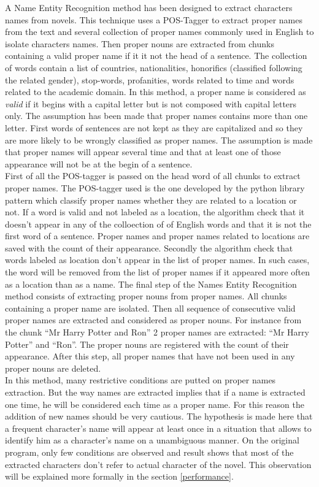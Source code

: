 \documentclass[a4paper, 12pt]{report}
\begin{document}
A Name Entity Recognition method has been designed to extract characters names from novels. This technique uses a POS-Tagger to extract proper names from the text and several collection of proper names commonly used in English to isolate characters names. Then proper nouns are extracted from chunks containing a valid proper name if it it not the head of a sentence. The collection of words contain a list of countries, nationalities, honorifics (classified following the related gender), stop-words, profanities, words related to time and words related to the academic domain. In this method, a  proper name is considered as \textit{valid} if it begins with a capital letter but is not composed with capital letters only. The assumption has been made that proper names contains more than one letter.  First words of sentences are not kept as they are capitalized and so they are more likely to be wrongly classified as proper names. The assumption is made that proper names will appear several time and that at least one of those appearance will not be at the begin of a sentence.\\

First of all the POS-tagger is passed on the head word of all chunks to extract  proper names. The POS-tagger used is the one developed by the python library pattern which classify  proper names whether they are related to a location or not. If a word is valid and not labeled as a location, the algorithm check that it doesn't appear in any of the colloection of of English words and that it is not the first word of a sentence. Proper names and  proper names related to locations are saved with the count of their appearance.
Secondly the algorithm check that words labeled as location don't appear in the list of proper names. In such cases, the word will be removed from the list of proper names if it appeared more often as a location than as a name.
The final step of the Names Entity Recognition method consists of extracting proper nouns from proper names. All chunks containing a proper name are isolated. Then all sequence of consecutive valid  proper names are extracted and considered as proper nouns. For instance from the chunk ``Mr Harry Potter and Ron'' 2 proper names are extracted: ``Mr Harry Potter'' and ``Ron''. The proper nouns are registered with the count of their appearance. After this step, all proper names that have not been used in any proper nouns are deleted.\\

In this method, many restrictive conditions are putted on proper names extraction. But the way names are extracted implies that if a name is extracted one time, he will be considered each time as a proper name. For this reason the addition of new names should be very cautious. The hypothesis is made here that a frequent character's name will appear at least once in a situation that allows to identify him as a character's name on a unambiguous manner. On the original program, only few conditions are observed and result shows that most of the extracted characters don't refer to actual character of the novel. This observation will be explained more formally in the section \ref{performance}.
\end{document}
